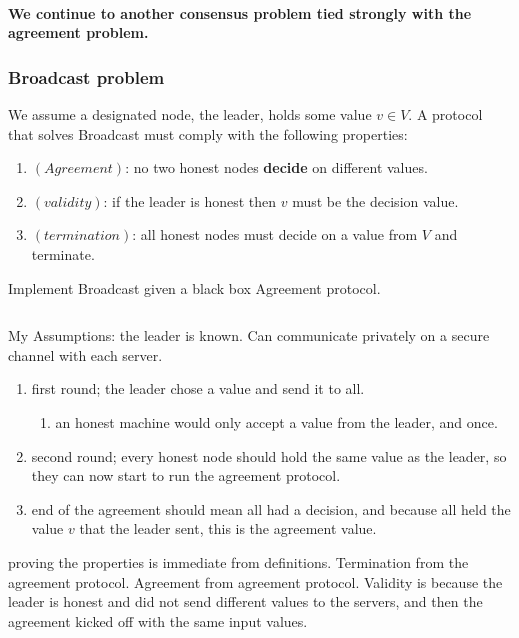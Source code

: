 \paragraph{We continue to another consensus problem tied strongly
with the agreement problem.}

\subsubsection{Broadcast problem}

We assume a designated node, the leader, holds some value $v\in V$.
A protocol that solves Broadcast must comply with the following properties:
\begin{enumerate}
\item $\left(Agreement\right)$: no two honest nodes \textbf{decide} on
different values.
\item $\left(validity\right)$: if the leader is honest then $v$ must be
the decision value.
\item $\left(termination\right)$: all honest nodes must decide on a value
from $V$ and terminate.
\end{enumerate}
\begin{xca}
Implement Broadcast given a black box Agreement protocol.
\end{xca}

\begin{sol}
$ $

My Assumptions: the leader is known. Can communicate privately on a secure
channel with each server.
\begin{enumerate}
\item first round; the leader chose a value and send it to all.
\begin{enumerate}
\item an honest machine would only accept a value from the leader, and once.
\end{enumerate}
\item second round; every honest node should hold the same value as the
leader, so they can now start to run the agreement protocol.
\item end of the agreement should mean all had a decision, and because all held
the value $v$ that the leader sent, this is the agreement value.
\end{enumerate}
proving the properties is immediate from definitions. Termination
from the agreement protocol. Agreement from agreement protocol. Validity
is because the leader is honest and did not send different values
to the servers, and then the agreement kicked off with the same input
values.
\end{sol}

